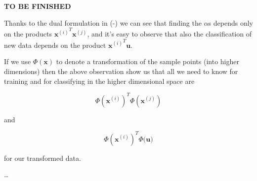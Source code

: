 \documentclass[11pt]{article}
\begin{document}
\textbf{TO BE FINISHED}

    Thanks to the dual formulation in (-) we can see that finding the
\(\alpha\)s depends only on the products
\({\mathbf{x}^{(i)}}^T \mathbf{x}^{(j)}\), and it's easy to observe that
also the classification of new data depends on the product
\({\mathbf{x}^{(i)}}^T \mathbf{u}\).

If we use \(\Phi(\mathbf{x})\) to denote a transformation of the sample
points (into higher dimensions) then the above observation show us that
all we need to know for training and for classifying in the higher
dimensional space are

\[\Phi\left({\mathbf{x}^{(i)}}\right)^T \Phi \left(\mathbf{x}^{(j)}\right)\]

and

\[\Phi \left( {\mathbf{x}^{(i)}}\right)^T \Phi \bigl( \mathbf{u} \bigr) \]

for our transformed data.

\ldots{}
\end{document}
